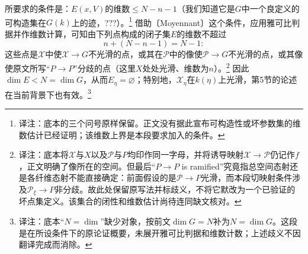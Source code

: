 \documentclass[openany,fontset=fandol]{ctexbook}
\newcommand{\note}[1]{\unskip\nobreak\footnote{译注：#1}}
\begin{document}
\newpage
所要求的条件是：$E(x,V)$的维数$\leq N-n-1$（我们知道它是$G$中一个良定义的可构造集在$G(k)$上的迹，???）。\note{底本的三个问号原样保留。正文没有据此宣布可构造性或坏参数集的维数估计已经证明；该维数上界是本段要求加入的条件。}
借助〔Moyennant〕这个条件，应用雅可比判据并作维数计算，可知由下列点构成的闭子集$E$的维数不超过
\[
n+(N-n-1)=N-1:
\]
这些点是$\mathcal X$中使$\mathcal X\to G$不光滑的点，或其在$\mathcal P$中的像使$\mathcal P\to G$不光滑的点，或其像使原文所写“$P\to P$”分歧的点（这里$X$处处光滑、维数为$n$）。\note{底本将$\mathcal X$与$X$以及$\mathcal P$与$P$均印作同一字母，并将诱导映射$\mathcal X\to\mathcal P$仍记作$f$，正文明确了像所在的空间。但最后“$P\to P$ is ramified”究竟指总空间态射还是各纤维态射不能直接确定：前面假设的是$\mathcal P\to P$光滑，而本段切映射条件涉及$\mathcal P_\xi\to P$非分歧。故此处保留原写法并标歧义，不将它默改为一个已验证的坏点集定义。该集合的闭性和维数估计尚待连同缺文核对。}
因此$\dim E<N=\dim G$，从而$E_\eta=\varnothing$；特别地，$\mathcal X_\eta$在$k(\eta)$上光滑，第5节的论述在当前背景下也有效。\note{底本“$N=\dim$”缺少对象，按前文$\dim G=N$补为$N=\dim G$。这段是在所设条件下的原论证概要，未展开雅可比判据和维数计数；上述歧义不因翻译完成而消除。}
\end{document}
